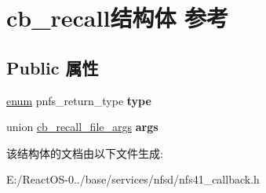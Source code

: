 \hypertarget{structcb__recall}{}\section{cb\+\_\+recall结构体 参考}
\label{structcb__recall}
\subsection*{Public 属性}
\begin{DoxyCompactItemize}
\item 
\mbox{\label{structcb__recall_a70239b56900082668cb3537bc75a72a5}} 
\hyperlink{interfaceenum}{enum} pnfs\+\_\+return\+\_\+type {\bfseries type}
\item 
\mbox{\label{structcb__recall_a0ecfe6938545922d9e8e5b0125d552c1}} 
union \hyperlink{unioncb__recall__file__args}{cb\+\_\+recall\+\_\+file\+\_\+args} {\bfseries args}
\end{DoxyCompactItemize}


该结构体的文档由以下文件生成\+:\begin{DoxyCompactItemize}
\item 
E\+:/\+React\+O\+S-\/0../base/services/nfsd/nfs41\+\_\+callback.\+h\end{DoxyCompactItemize}
